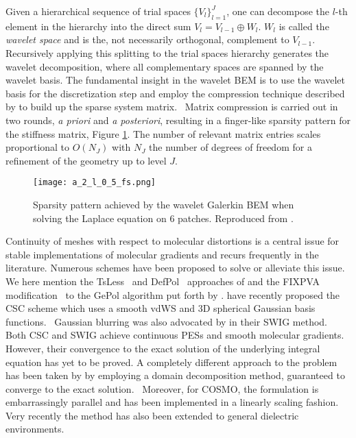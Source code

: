 Given a hierarchical sequence of trial spaces
$\lbrace V_l\rbrace_{l=1}^J$, one can decompose the $l$-th element in
the hierarchy into the direct sum $V_l = V_{l-1} \oplus W_l$.
$W_l$ is called the \emph{wavelet space} and is the, not necessarily
orthogonal, complement to $V_{l-1}$.
Recursively applying this splitting to the trial spaces hierarchy
generates the wavelet decomposition, where all complementary spaces are
spanned by the wavelet basis.
The fundamental insight in the wavelet \acrshort{BEM} is to use the wavelet
basis for the discretization step and employ the compression technique
described by \citeauthor{Dahmen2006-pj} to build up the sparse system
matrix.~\autocite{Harbrecht2004-uo, Harbrecht2006-ug, Dahmen2006-pj}
Matrix compression is carried out in two rounds, \emph{a priori} and \emph{a
posteriori}, resulting in a finger-like sparsity pattern for the
stiffness matrix, Figure \ref{fig:finger-structure}.
The number of relevant matrix entries scales proportional to $O(N_J)$
with $N_J$ the number of degrees of freedom for a refinement of the
geometry up to level $J$.

\begin{figure}[tb]
   \texttt{[image: a\_2\_l\_0\_5\_fs.png]}
   \caption[Sparsity pattern achieved by the wavelet Galerkin \acrshort{BEM}.]{
   Sparsity pattern achieved by the wavelet Galerkin \acrshort{BEM} when
   solving the Laplace equation on 6 patches.
   Reproduced from .
   }
   \label{fig:finger-structure}
\end{figure}

Continuity of meshes with respect to molecular distortions is a
central issue for stable implementations of molecular gradients and
recurs frequently in the literature.
Numerous schemes have been proposed to solve or alleviate this issue.
We here mention the TsLess~\autocite{Pomelli2004-lb} and
DefPol~\autocite{Pomelli1998-ob, Pomelli1999-dc} approaches of
\citeauthor{Pomelli1998-ob} and the FIXPVA
modification~\autocite{Su2009-em} to the GePol algorithm put forth by
\citeauthor{Su2009-em}.
\citeauthor{Scalmani2010-tw} have recently proposed the \gls{CSC} scheme
which uses a smooth \acrshort{vdWS} and 3D spherical Gaussian basis
functions.~\autocite{Scalmani2010-tw, York1999-xy}
Gaussian blurring was also advocated by \citeauthor{Lange2010-jp} in
their \gls{SWIG} method.~\autocite{Lange2010-jp, Lange2010-qo}
Both \acrshort{CSC} and \acrshort{SWIG} achieve continuous \acsp{PES} and smooth
molecular gradients. However, their convergence to the exact solution of
the underlying integral equation has yet to be proved.
A completely different approach to the problem has been taken by
\citeauthor{Cances2013-jg} by employing a domain decomposition
method, guaranteed to converge to the exact solution.~\autocite{Quarteroni1999-jt}
Moreover, for \acrshort{COSMO}, the formulation is embarrassingly
parallel and has been implemented in a linearly scaling fashion.~\autocite{Cances2013-jg, Lipparini2013-cy, Lipparini2014-to,
Lipparini2014-fq}
Very recently the method has also been extended to general dielectric
environments.~\autocite{Stamm2016-fv}

